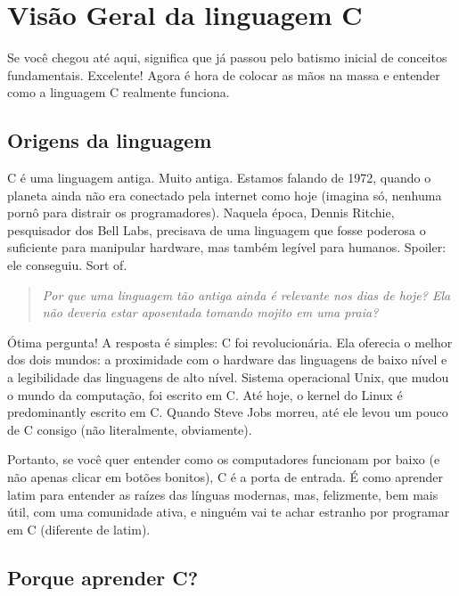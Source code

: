
\chapter{Visão Geral da linguagem C}

Se você chegou até aqui, significa que já passou pelo batismo inicial de conceitos fundamentais. Excelente! Agora é hora de colocar as mãos na massa e entender como a linguagem C realmente funciona.

\section{Origens da linguagem}

C é uma linguagem antiga. Muito antiga. Estamos falando de 1972, quando o planeta ainda não era conectado pela internet como hoje (imagina só, nenhuma pornô para distrair os programadores). Naquela época, Dennis Ritchie, pesquisador dos Bell Labs, precisava de uma linguagem que fosse poderosa o suficiente para manipular hardware, mas também legível para humanos. Spoiler: ele conseguiu. Sort of.

\begin{quote}
\textit{Por que uma linguagem tão antiga ainda é relevante nos dias de hoje? Ela não deveria estar aposentada tomando mojito em uma praia?}
\end{quote}

Ótima pergunta! A resposta é simples: C foi revolucionária. Ela oferecia o melhor dos dois mundos: a proximidade com o hardware das linguagens de baixo nível e a legibilidade das linguagens de alto nível. Sistema operacional Unix, que mudou o mundo da computação, foi escrito em C. Até hoje, o kernel do Linux é predominantly escrito em C. Quando Steve Jobs morreu, até ele levou um pouco de C consigo (não literalmente, obviamente).

Portanto, se você quer entender como os computadores funcionam por baixo (e não apenas clicar em botões bonitos), C é a porta de entrada. É como aprender latim para entender as raízes das línguas modernas, mas, felizmente, bem mais útil, com uma comunidade ativa, e ninguém vai te achar estranho por programar em C (diferente de latim).

\section{Porque aprender C?}

